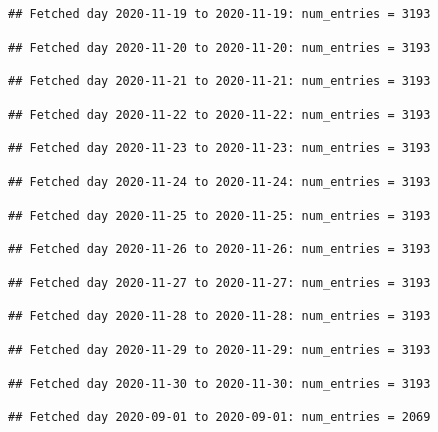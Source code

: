 \documentclass[]{article}
\begin{document}
\begin{verbatim}
## Fetched day 2020-11-19 to 2020-11-19: num_entries = 3193
\end{verbatim}

\begin{verbatim}
## Fetched day 2020-11-20 to 2020-11-20: num_entries = 3193
\end{verbatim}

\begin{verbatim}
## Fetched day 2020-11-21 to 2020-11-21: num_entries = 3193
\end{verbatim}

\begin{verbatim}
## Fetched day 2020-11-22 to 2020-11-22: num_entries = 3193
\end{verbatim}

\begin{verbatim}
## Fetched day 2020-11-23 to 2020-11-23: num_entries = 3193
\end{verbatim}

\begin{verbatim}
## Fetched day 2020-11-24 to 2020-11-24: num_entries = 3193
\end{verbatim}

\begin{verbatim}
## Fetched day 2020-11-25 to 2020-11-25: num_entries = 3193
\end{verbatim}

\begin{verbatim}
## Fetched day 2020-11-26 to 2020-11-26: num_entries = 3193
\end{verbatim}

\begin{verbatim}
## Fetched day 2020-11-27 to 2020-11-27: num_entries = 3193
\end{verbatim}

\begin{verbatim}
## Fetched day 2020-11-28 to 2020-11-28: num_entries = 3193
\end{verbatim}

\begin{verbatim}
## Fetched day 2020-11-29 to 2020-11-29: num_entries = 3193
\end{verbatim}

\begin{verbatim}
## Fetched day 2020-11-30 to 2020-11-30: num_entries = 3193
\end{verbatim}

\begin{verbatim}
## Fetched day 2020-09-01 to 2020-09-01: num_entries = 2069
\end{verbatim}
\end{document}
